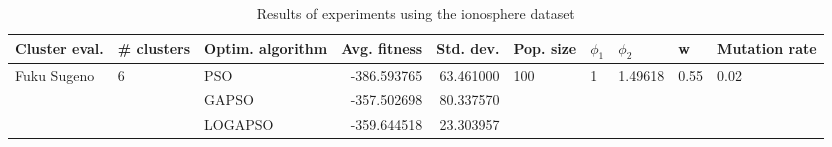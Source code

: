 \begin{table}
\centering
\caption{Results of experiments using the ionosphere dataset}
\begin{tabular}{lllrrlllll}
\toprule
               Cluster eval. &        \# clusters & Optim. algorithm &  Avg. fitness &  Std. dev. &            Pop. size &         $\phi_{1}$ &               $\phi_{2}$ &                     w &         Mutation rate \\
\midrule
\multirow{3}{*}{Fuku Sugeno} & \multirow{3}{*}{6} &              PSO &   -386.593765 &  63.461000 & \multirow{3}{*}{100} & \multirow{3}{*}{1} & \multirow{3}{*}{1.49618} & \multirow{3}{*}{0.55} & \multirow{3}{*}{0.02} \\
                             &                    &            GAPSO &   -357.502698 &  80.337570 &                      &                    &                          &                       &                       \\
                             &                    &          LOGAPSO &   -359.644518 &  23.303957 &                      &                    &                          &                       &                       \\
\bottomrule
\end{tabular}
\end{table}
